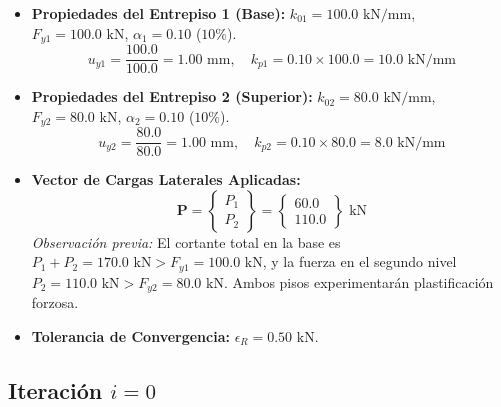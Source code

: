 \documentclass[11pt,letterpaper]{article}
\begin{document}
\begin{itemize}
    \item \textbf{Propiedades del Entrepiso 1 (Base):}
    $k_{01} = 100.0\text{ kN/mm}$, $F_{y1} = 100.0\text{ kN}$, $\alpha_1 = 0.10$ ($10\%$).
    \[
        u_{y1} = \frac{100.0}{100.0} = 1.00\text{ mm}, \quad k_{p1} = 0.10 \times 100.0 = 10.0\text{ kN/mm}
    \]
    \item \textbf{Propiedades del Entrepiso 2 (Superior):}
    $k_{02} = 80.0\text{ kN/mm}$, $F_{y2} = 80.0\text{ kN}$, $\alpha_2 = 0.10$ ($10\%$).
    \[
        u_{y2} = \frac{80.0}{80.0} = 1.00\text{ mm}, \quad k_{p2} = 0.10 \times 80.0 = 8.0\text{ kN/mm}
    \]
    \item \textbf{Vector de Cargas Laterales Aplicadas:}
    \[
        \mathbf{P} = \begin{Bmatrix} P_1 \\ P_2 \end{Bmatrix} = \begin{Bmatrix} 60.0 \\ 110.0 \end{Bmatrix} \text{ kN}
    \]
    \textit{Observación previa:} El cortante total en la base es $P_1 + P_2 = 170.0\text{ kN} > F_{y1} = 100.0\text{ kN}$, y la fuerza en el segundo nivel $P_2 = 110.0\text{ kN} > F_{y2} = 80.0\text{ kN}$. Ambos pisos experimentarán plastificación forzosa.
    \item \textbf{Tolerancia de Convergencia:} $\epsilon_R = 0.50\text{ kN}$.
\end{itemize}

\subsection{Iteración \texorpdfstring{$i = 0$}{i = 0}}
\end{document}
